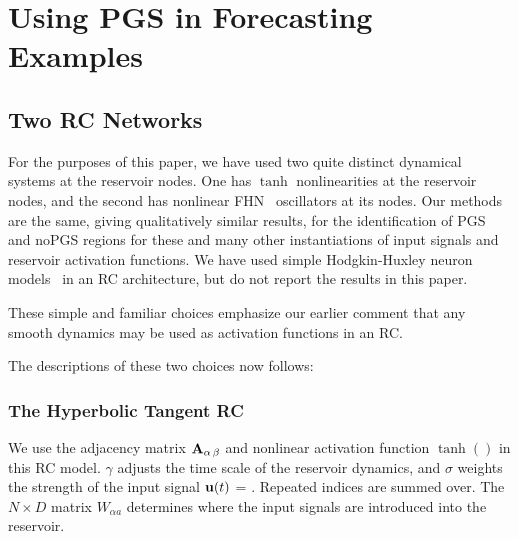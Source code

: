 \documentclass[12pt]{article}
\begin{document}
\section{Using PGS in Forecasting Examples}


\subsection{Two RC Networks}
For the purposes of this paper, we have used two quite distinct dynamical systems at the reservoir nodes. One has $\tanh$ nonlinearities at the reservoir nodes, and the second has nonlinear FHN~\cite{fitzhugh1961impulses,Nagumo1962} oscillators at its nodes. Our methods are the same, giving qualitatively similar results, for the identification of PGS and noPGS regions for these and many other instantiations of input signals and reservoir activation functions. We have used simple Hodgkin-Huxley neuron models~\cite{hodgkin1952quantitative,jwu,willshaw} in an RC architecture, but do not report the results in this paper.

These simple and familiar choices emphasize our earlier comment that any smooth dynamics may be used as activation functions in an RC.

The descriptions of these two choices now follows:

\subsubsection{The Hyperbolic Tangent RC}

We use the adjacency matrix $\bf{A_{\alpha\,\beta}}$ and nonlinear activation function $\tanh()$ in this RC model. $\gamma$ adjusts the time scale of the reservoir dynamics, and $\sigma$ weights the strength of the input signal $\mbox{$\bf{u}$}(t)$
\be
{} = \gamma {}.
\label{tanhres}
\ee
Repeated indices are summed over. %
The $N \times D$ matrix $W_{\alpha a}$ determines where the input signals are introduced into the reservoir.
\end{document}

